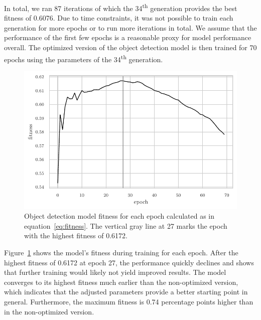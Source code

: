 \documentclass[draft,final]{vutinfth} %
\begin{document}
In total, we ran \num{87} iterations of which the
\num{34}\textsuperscript{th} generation provides the best fitness of
\num{0.6076}. Due to time constraints, it was not possible to train
each generation for more epochs or to run more iterations in total. We
assume that the performance of the first few epochs is a reasonable
proxy for model performance overall. The optimized version of the
object detection model is then trained for \num{70} epochs using the
parameters of the \num{34}\textsuperscript{th} generation.

\begin{figure}
  \centering
  \includegraphics{graphics/model_fitness_final.pdf}
  \caption[Optimized object detection fitness per epoch.]{Object
    detection model fitness for each epoch calculated as in
    equation~\ref{eq:fitness}. The vertical gray line at \num{27}
    marks the epoch with the highest fitness of \num{0.6172}.}
  \label{fig:hyp-opt-fitness}
\end{figure}

Figure~\ref{fig:hyp-opt-fitness} shows the model's fitness during
training for each epoch. After the highest fitness of \num{0.6172} at
epoch \num{27}, the performance quickly declines and shows that
further training would likely not yield improved results. The model
converges to its highest fitness much earlier than the non-optimized
version, which indicates that the adjusted parameters provide a better
starting point in general. Furthermore, the maximum fitness is 0.74
percentage points higher than in the non-optimized version.
\end{document}
